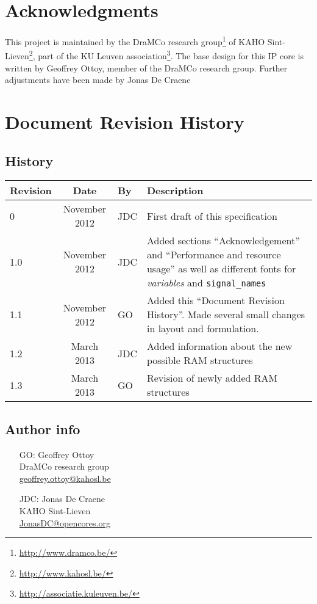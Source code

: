 \chapter*{Acknowledgments}
This project is maintained by the DraMCo research group\footnote{\url{http://www.dramco.be/}} of KAHO Sint-Lieven\footnote{\url{http://www.kahosl.be/}}, part of the KU Leuven association\footnote{\url{http://associatie.kuleuven.be/}}.
The base design for this IP core is written by Geoffrey Ottoy, member of the DraMCo research group. Further adjustments have been made by Jonas De Craene


\chapter*{Document Revision History} 

\section*{History}
\begin{tabular}{|l|c|l|p{10cm}|}
	\hline
	\rowcolor{Gray}
	\textbf{Revision} & \textbf{Date} & \textbf{By} & \textbf{Description} \\
	\hline
	0	& November 2012	& JDC	& First draft of this specification\\
	\hline
	1.0 & November 2012	& JDC	& Added sections ``Acknowledgement'' and ``Performance and resource usage'' as well as different fonts for \textit{variables} and \verb|signal_names|\\
	\hline
	1.1 & November 2012	& GO	& Added this ``Document Revision History''. Made several small changes in layout and formulation.\\
	\hline
	1.2 & March 2013	& JDC	& Added information about the new possible RAM structures\\
	\hline
	1.3 & March 2013	& GO	& Revision of newly added RAM structures\\
	\hline
\end{tabular}%

\section*{Author info}

\begin{itemize}
\item[GO:] Geoffrey Ottoy\\DraMCo research group\\\url{geoffrey.ottoy@kahosl.be}
\item[JDC:] Jonas De Craene\\KAHO Sint-Lieven\\\url{JonasDC@opencores.org}
\end{itemize}